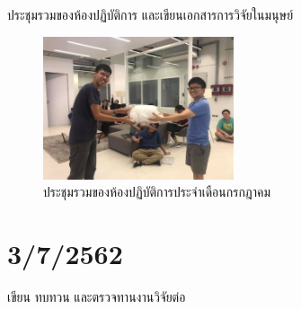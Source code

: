 ประชุมรวมของห้องปฏิบัติการ และเขียนเอกสารการวิจัยในมนุษย์

\begin{figure}
    \centering
    \includegraphics[width=0.5\textwidth]{images/lab_meetup.jpg}
    \caption{ประชุมรวมของห้องปฏิบัติการประจำเดือนกรกฎาคม}
\end{figure}

\section*{3/7/2562}

เขียน ทบทวน และตรวจทานงานวิจัยต่อ